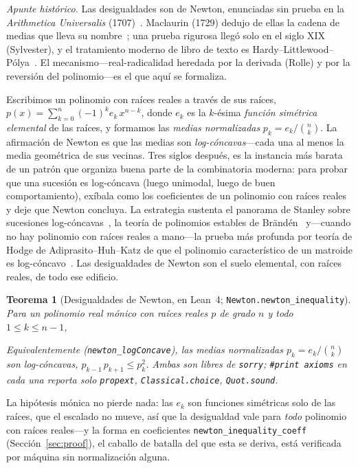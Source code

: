 \documentclass[11pt]{article}
\newtheorem{theorem}{Teorema}
\newcommand{\lean}[1]{\texttt{#1}}
\newcommand{\keyeq}[1]{\begin{center}\keybox{$\displaystyle #1$}\end{center}}
\begin{document}
\emph{Apunte hist\'orico.} Las desigualdades son de Newton, enunciadas sin prueba en la
\emph{Arithmetica Universalis} (1707)~\cite{Newton1707}. Maclaurin (1729) dedujo de ellas la cadena
de medias que lleva su nombre~\cite{Maclaurin1729}; una prueba rigurosa lleg\'o solo en el siglo XIX
(Sylvester), y el tratamiento moderno de libro de texto es
Hardy--Littlewood--P\'olya~\cite{HLP}. El mecanismo---real-radicalidad heredada por la derivada
(Rolle) y por la reversi\'on del polinomio---es el que aqu\'i se formaliza.

Escribimos un polinomio con ra\'ices reales a trav\'es de sus ra\'ices,
$p(x)=\sum_{k=0}^{n}(-1)^k e_k\,x^{n-k}$, donde $e_k$ es la $k$-\'esima \emph{funci\'on sim\'etrica
elemental} de las ra\'ices, y formamos las \emph{medias normalizadas} $p_k=e_k/\binom{n}{k}$. La
afirmaci\'on de Newton es que las medias son \emph{log-c\'oncavas}---cada una al menos la media
geom\'etrica de sus vecinas. Tres siglos despu\'es, es la instancia m\'as barata de un patr\'on que
organiza buena parte de la combinatoria moderna: para probar que una sucesi\'on es log-c\'oncava
(luego unimodal, luego de buen comportamiento), ex\'ibala como los coeficientes de un polinomio con
ra\'ices reales y deje que Newton concluya. La estrategia sustenta el panorama de Stanley sobre
sucesiones log-c\'oncavas~\cite{Stanley1989}, la teor\'ia de polinomios estables de
Br\"and\'en~\cite{Branden2015} y---cuando no hay polinomio con ra\'ices reales a mano---la prueba
m\'as profunda por teor\'ia de Hodge de Adiprasito--Huh--Katz de que el polinomio caracter\'istico
de un matroide es log-c\'oncavo~\cite{AHK2018}. Las desigualdades de Newton son el suelo elemental,
con ra\'ices reales, de todo ese edificio.

\begin{theorem}[Desigualdades de Newton, en Lean~4; \lean{Newton.newton\_inequality}]
\label{thm:newton}
Para un polinomio real \emph{m\'onico} con ra\'ices reales $p$ de grado $n$ y todo $1\le k\le n-1$,
\keyeq{e_k^2\,\binom{n}{k-1}\binom{n}{k+1}\;\ge\;e_{k-1}\,e_{k+1}\,\binom{n}{k}^{2}.}
Equivalentemente (\lean{newton\_logConcave}), las medias normalizadas $p_k=e_k/\binom{n}{k}$ son
log-c\'oncavas, $p_{k-1}\,p_{k+1}\le p_k^2$. Ambas son libres de \lean{sorry}; \lean{\#print axioms}
en cada una reporta solo \lean{propext}, \lean{Classical.choice}, \lean{Quot.sound}.
\end{theorem}

La hip\'otesis m\'onica no pierde nada: las $e_k$ son funciones sim\'etricas solo de las ra\'ices,
que el escalado no mueve, as\'i que la desigualdad vale para \emph{todo} polinomio con ra\'ices
reales---y la forma en coeficientes \lean{newton\_inequality\_coeff} (Secci\'on~\ref{sec:proof}), el
caballo de batalla del que esta se deriva, est\'a verificada por m\'aquina sin normalizaci\'on
alguna.
\end{document}
